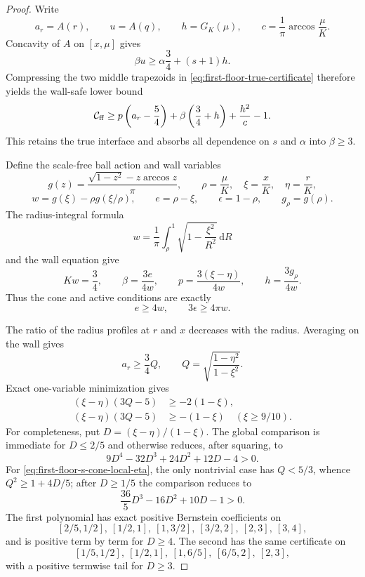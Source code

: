\documentclass[11pt]{article}
\theoremstyle{remark}
\newcommand{\dd}{\,\mathrm d}
\begin{document}
\begin{proof}
Write
\[
 a_r=A(r),\qquad u=A(q),\qquad h=G_K(\mu),\qquad
 c=\frac1\pi\arccos\frac\mu K.
\]
Concavity of $A$ on $[x,\mu]$ gives
\[
 \beta u\geq\alpha\frac34+(s+1)h.
\]
Compressing the two middle trapezoids in
\eqref{eq:first-floor-true-certificate} therefore yields the wall-safe
lower bound
\begin{equation}
 \mathcal C_{\rm ff}\geq
 p\left(a_r-\frac54\right)
 +\beta\left(\frac34+h\right)+\frac{h^2}{c}-1.
 \label{eq:first-floor-beta-compression}
\end{equation}
This retains the true interface and absorbs all dependence on $s$ and
$\alpha$ into $\beta\geq3$.

Define the scale-free ball action and wall variables
\[
 g(z)=\frac{\sqrt{1-z^2}-z\arccos z}{\pi},\qquad
 \rho=\frac\mu K,\quad \xi=\frac xK,\quad \eta=\frac rK,
\]
\[
 w=g(\xi)-\rho g(\xi/\rho),\qquad
 e=\rho-\xi,\qquad \epsilon=1-\rho,
 \qquad g_\rho=g(\rho).
\]
The radius-integral formula
\begin{equation}
 w=\frac1\pi\int_\rho^1
 \sqrt{1-\frac{\xi^2}{R^2}}\dd R
 \label{eq:first-floor-s-cone-wall-integral}
\end{equation}
and the wall equation give
\begin{equation}
 Kw=\frac34,\qquad
 \beta=\frac{3e}{4w},\qquad
 p=\frac{3(\xi-\eta)}{4w},\qquad
 h=\frac{3g_\rho}{4w}.
 \label{eq:first-floor-s-cone-scaling}
\end{equation}
Thus the cone and active conditions are exactly
\begin{equation}
 e\geq4w,\qquad 3\epsilon\geq4\pi w.
 \label{eq:first-floor-s-cone-constraints}
\end{equation}

The ratio of the radius profiles at $r$ and $x$ decreases with the radius.
Averaging on the wall gives
\[
 a_r\geq\frac34Q,\qquad
 Q=\sqrt{\frac{1-\eta^2}{1-\xi^2}}.
\]
Exact one-variable minimization gives
\begin{align}
 (\xi-\eta)(3Q-5)&\geq-2(1-\xi),
 \label{eq:first-floor-s-cone-global-eta}\\
 (\xi-\eta)(3Q-5)&\geq-(1-\xi)
 \quad(\xi\geq9/10).
 \label{eq:first-floor-s-cone-local-eta}
\end{align}
For completeness, put $D=(\xi-\eta)/(1-\xi)$.  The global comparison is
immediate for $D\leq2/5$ and otherwise reduces, after squaring, to
\[
 9D^4-32D^3+24D^2+12D-4>0.
\]
For \eqref{eq:first-floor-s-cone-local-eta}, the only nontrivial case has
$Q<5/3$, whence $Q^2\geq1+4D/5$; after $D\geq1/5$ the comparison reduces to
\[
 \frac{36}{5}D^3-16D^2+10D-1>0.
\]
The first polynomial has exact positive Bernstein coefficients on
\[
 [2/5,1/2],\ [1/2,1],\ [1,3/2],\ [3/2,2],\ [2,3],\ [3,4],
\]
and is positive term by term for $D\geq4$.  The second has the same
certificate on
\[
 [1/5,1/2],\ [1/2,1],\ [1,6/5],\ [6/5,2],\ [2,3],
\]
with a positive termwise tail for $D\geq3$.


\end{proof}
\end{document}
